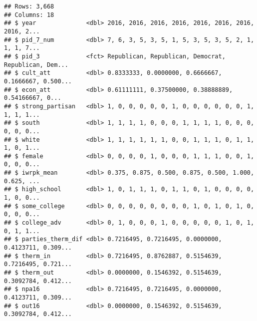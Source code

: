 \documentclass[
]{article}
\newenvironment{Shaded}{\begin{snugshade}}{\end{snugshade}}
\newcommand{\DecValTok}[1]{\textcolor[rgb]{0.00,0.00,0.81}{#1}}
\newcommand{\KeywordTok}[1]{\textcolor[rgb]{0.13,0.29,0.53}{\textbf{#1}}}
\newcommand{\NormalTok}[1]{#1}
\newcommand{\OperatorTok}[1]{\textcolor[rgb]{0.81,0.36,0.00}{\textbf{#1}}}
\newcommand{\StringTok}[1]{\textcolor[rgb]{0.31,0.60,0.02}{#1}}
\begin{document}
\begin{verbatim}
## Rows: 3,668
## Columns: 18
## $ year              <dbl> 2016, 2016, 2016, 2016, 2016, 2016, 2016, 2016, 2...
## $ pid_7_num         <dbl> 7, 6, 3, 5, 3, 5, 1, 5, 3, 5, 3, 5, 2, 1, 1, 1, 7...
## $ pid_3             <fct> Republican, Republican, Democrat, Republican, Dem...
## $ cult_att          <dbl> 0.8333333, 0.0000000, 0.6666667, 0.1666667, 0.500...
## $ econ_att          <dbl> 0.61111111, 0.37500000, 0.38888889, 0.54166667, 0...
## $ strong_partisan   <dbl> 1, 0, 0, 0, 0, 0, 1, 0, 0, 0, 0, 0, 0, 1, 1, 1, 1...
## $ south             <dbl> 1, 1, 1, 1, 0, 0, 0, 1, 1, 1, 1, 0, 0, 0, 0, 0, 0...
## $ white             <dbl> 1, 1, 1, 1, 1, 1, 0, 0, 1, 1, 1, 0, 1, 1, 1, 0, 1...
## $ female            <dbl> 0, 0, 0, 0, 1, 0, 0, 0, 1, 1, 1, 0, 0, 1, 0, 0, 0...
## $ iwrpk_mean        <dbl> 0.375, 0.875, 0.500, 0.875, 0.500, 1.000, 0.625, ...
## $ high_school       <dbl> 1, 0, 1, 1, 1, 0, 1, 1, 0, 1, 0, 0, 0, 0, 1, 0, 0...
## $ some_college      <dbl> 0, 0, 0, 0, 0, 0, 0, 0, 1, 0, 1, 0, 1, 0, 0, 0, 0...
## $ college_adv       <dbl> 0, 1, 0, 0, 0, 1, 0, 0, 0, 0, 0, 1, 0, 1, 0, 1, 1...
## $ parties_therm_dif <dbl> 0.7216495, 0.7216495, 0.0000000, 0.4123711, 0.309...
## $ therm_in          <dbl> 0.7216495, 0.8762887, 0.5154639, 0.7216495, 0.721...
## $ therm_out         <dbl> 0.0000000, 0.1546392, 0.5154639, 0.3092784, 0.412...
## $ npa16             <dbl> 0.7216495, 0.7216495, 0.0000000, 0.4123711, 0.309...
## $ out16             <dbl> 0.0000000, 0.1546392, 0.5154639, 0.3092784, 0.412...
\end{verbatim}

\begin{Shaded}
\end{Shaded}
\end{document}
